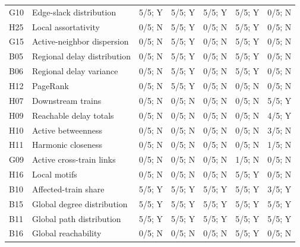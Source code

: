 \begin{longtable}{@{}p{0.7cm}p{4.8cm}rrrrr@{}}
G10 & Edge-slack distribution & 5/5; Y & 5/5; Y & 5/5; Y & 5/5; Y & 0/5; N \\

H25 & Local assortativity & 0/5; N & 5/5; Y & 0/5; N & 5/5; Y & 0/5; N \\

G15 & Active-neighbor dispersion & 0/5; N & 5/5; Y & 0/5; N & 5/5; Y & 0/5; N \\

B05 & Regional delay distribution & 0/5; N & 5/5; Y & 0/5; N & 5/5; Y & 0/5; N \\

B06 & Regional delay variance & 0/5; N & 5/5; Y & 0/5; N & 5/5; Y & 0/5; N \\

H12 & PageRank & 0/5; N & 5/5; Y & 0/5; N & 0/5; N & 0/5; N \\

H07 & Downstream trains & 0/5; N & 0/5; N & 0/5; N & 0/5; N & 5/5; Y \\

H09 & Reachable delay totals & 0/5; N & 0/5; N & 0/5; N & 0/5; N & 4/5; Y \\

H10 & Active betweenness & 0/5; N & 0/5; N & 0/5; N & 0/5; N & 3/5; N \\

H11 & Harmonic closeness & 0/5; N & 0/5; N & 0/5; N & 0/5; N & 1/5; N \\

G09 & Active cross-train links & 0/5; N & 0/5; N & 0/5; N & 1/5; N & 0/5; N \\

H16 & Local motifs & 0/5; N & 0/5; N & 0/5; N & 5/5; Y & 0/5; N \\

B10 & Affected-train share & 5/5; Y & 5/5; Y & 5/5; Y & 5/5; Y & 3/5; Y \\

B15 & Global degree distribution & 5/5; Y & 5/5; Y & 5/5; Y & 5/5; Y & 5/5; Y \\

B11 & Global path distribution & 5/5; Y & 5/5; Y & 5/5; Y & 5/5; Y & 5/5; Y \\

B16 & Global reachability & 0/5; N & 0/5; N & 0/5; N & 5/5; Y & 0/5; N \\

\end{longtable}\endgroup


